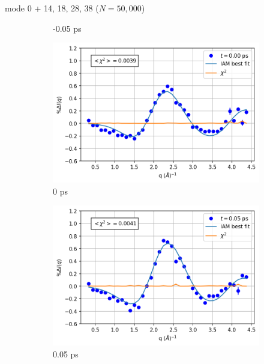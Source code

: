 \documentclass{beamer}
\newcommand\w{0.32}
\begin{document}
\begin{frame}{mode 0 + 14, 18, 28, 38 ($N=50{,}000$)}
\begin{figure}
\begin{subfigure}[b]{\w\textwidth}
			\caption{-0.05 ps}
		\end{subfigure}
		\begin{subfigure}[b]{\w\textwidth}
			\centering
			\includegraphics[width=\textwidth]{figures/20000_0+vstrongmodes_0.00.png}
			\caption{0 ps}
		\end{subfigure}
		\begin{subfigure}[b]{\w\textwidth}
			\centering
			\includegraphics[width=\textwidth]{figures/20000_0+vstrongmodes_0.05.png}
			\caption{0.05 ps}
		\end{subfigure}
		\begin{subfigure}[b]{\w\textwidth}
			\centering

\end{subfigure}
\end{figure}
\end{frame}
\end{document}
